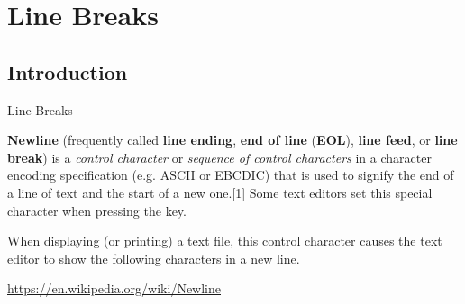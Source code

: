 \documentclass[english,aspectratio=169,handout]{beamer}
\begin{document}
\section{Line Breaks}
\subsection{Introduction}
\begin{frame}{Line Breaks}

\begin{definition}
    \textbf{Newline} (frequently called \textbf{line ending}, \textbf{end of line} (\textbf{EOL}), \textbf{line feed}, or \textbf{line break}) is a \textit{control character} or \textit{sequence of control characters} in a character encoding specification (e.g. ASCII or EBCDIC) that is used to signify the end of a line of text and the start of a new one.[1] Some text editors set this special character when pressing the  key.

When displaying (or printing) a text file, this control character causes the text editor to show the following characters in a new line. 
\end{definition}

\url{https://en.wikipedia.org/wiki/Newline}
\end{frame}
\end{document}
